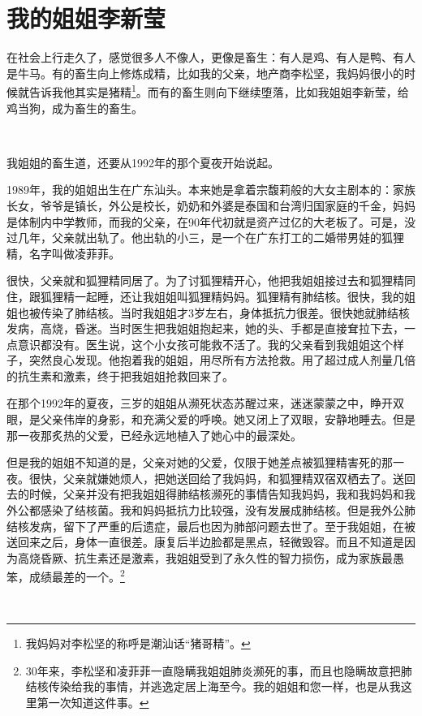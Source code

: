 \newpage

\section{我的姐姐李新莹}
\label{sister}

在社会上行走久了，感觉很多人不像人，更像是畜生：有人是鸡、有人是鸭、有人是牛马。有的畜生向上修炼成精，比如我的父亲，地产商李松坚，我妈妈很小的时候就告诉我他其实是猪精\footnote{我妈妈对李松坚的称呼是潮汕话``猪哥精''。}。而有的畜生则向下继续堕落，比如我姐姐李新莹，给鸡当狗，成为畜生的畜生。

\ 

我姐姐的畜生道，还要从1992年的那个夏夜开始说起。

1989年，我的姐姐出生在广东汕头。本来她是拿着宗馥莉般的大女主剧本的：家族长女，爷爷是镇长，外公是校长，奶奶和外婆是泰国和台湾归国家庭的千金，妈妈是体制内中学教师，而我的父亲，在90年代初就是资产过亿的大老板了。可是，没过几年，父亲就出轨了。他出轨的小三，是一个在广东打工的二婚带男娃的狐狸精，名字叫做凌菲菲。

很快，父亲就和狐狸精同居了。为了讨狐狸精开心，他把我姐姐接过去和狐狸精同住，跟狐狸精一起睡，还让我姐姐叫狐狸精妈妈。狐狸精有肺结核。很快，我的姐姐也被传染了肺结核。当时我姐姐才3岁左右，身体抵抗力很差。很快她就肺结核发病，高烧，昏迷。当时医生把我姐姐抱起来，她的头、手都是直接耷拉下去，一点意识都没有。医生说，这个小女孩可能救不活了。我的父亲看到我姐姐这个样子，突然良心发现。他抱着我的姐姐，用尽所有方法抢救。用了超过成人剂量几倍的抗生素和激素，终于把我姐姐抢救回来了。

在那个1992年的夏夜，三岁的姐姐从濒死状态苏醒过来，迷迷蒙蒙之中，睁开双眼，是父亲伟岸的身影，和充满父爱的呼唤。她又闭上了双眼，安静地睡去。但是那一夜那炙热的父爱，已经永远地植入了她心中的最深处。

但是我的姐姐不知道的是，父亲对她的父爱，仅限于她差点被狐狸精害死的那一夜。很快，父亲就嫌她烦人，把她送回给了我妈妈，和狐狸精双宿双栖去了。送回去的时候，父亲并没有把我姐姐得肺结核濒死的事情告知我妈妈，我和我妈妈和我外公都感染了结核菌。我和妈妈抵抗力比较强，没有发展成肺结核。但是我外公肺结核发病，留下了严重的后遗症，最后也因为肺部问题去世了。至于我姐姐，在被送回来之后，身体一直很差。康复后半边脸都是黑点，轻微毁容。而且不知道是因为高烧昏厥、抗生素还是激素，我姐姐受到了永久性的智力损伤，成为家族最愚笨，成绩最差的一个。\footnote{30年来，李松坚和凌菲菲一直隐瞒我姐姐肺炎濒死的事，而且也隐瞒故意把肺结核传染给我的事情，并逃逸定居上海至今。我的姐姐和您一样，也是从我这里第一次知道这件事。}

\ 

